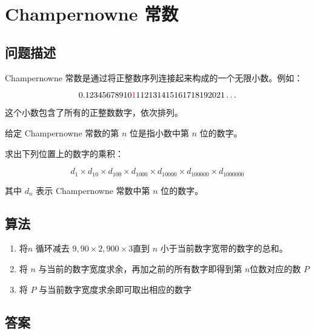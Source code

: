 \section{Champernowne 常数}
\subsection{问题描述}
\begin{tcolorbox}

	Champernowne 常数是通过将正整数序列连接起来构成的一个无限小数。例如：

	\[
		0.12345678910\textcolor{red}{1}112131415161718192021\ldots
	\]

	这个小数包含了所有的正整数数字，依次排列。

	给定 Champernowne 常数的第 \( n \) 位是指小数中第 \( n \) 位的数字。

	求出下列位置上的数字的乘积：

	\[
		d_1 \times d_{10} \times d_{100} \times d_{1000} \times d_{10000} \times d_{100000} \times d_{1000000}
	\]

	其中 \( d_n \) 表示 Champernowne 常数中第 \( n \) 位的数字。
\end{tcolorbox}

\subsection{算法}
\begin{enumerate}
	\item 将$ n $ 循环减去 \( 9, 90 \times 2, 900 \times 3 \)直到 \( n \) 小于当前数字宽带的数字的总和。
	\item 将 \( n \) 与当前的数字宽度求余，再加之前的所有数字即得到第 \( n \)位数对应的数 \( P \)
	\item 将 \( P \) 与当前数字宽度求余即可取出相应的数字
\end{enumerate}

\subsection{答案}
